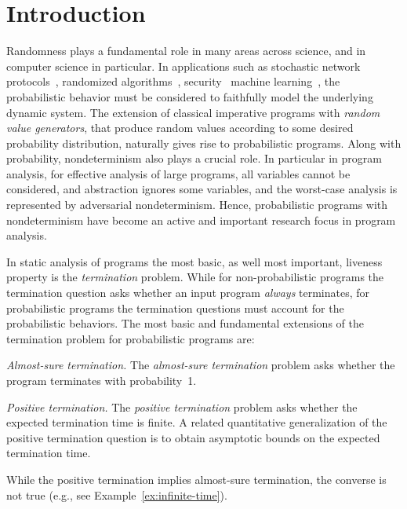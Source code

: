 

\section{Introduction}\label{sec:introduction}


Randomness plays a fundamental role in many areas across science, and in 
computer science in particular.
In applications such as stochastic network protocols~\cite{BaierBook,prism},
randomized algorithms~\cite{RandBook,RandBook2}, 
security~\cite{BGGHS16:diff-privacy-coupling,BGHP16:diff-privacy-siglog} 
machine 
learning~\cite{LearningSurvey,G15},
the probabilistic behavior must be considered to faithfully model the underlying dynamic system.
The extension of classical imperative programs with \emph{random value generators}, 
that produce random values according to some desired probability distribution, 
naturally gives rise to probabilistic programs.
Along with probability, nondeterminism also plays a crucial role.
In particular in program analysis, for effective analysis of large programs,
all variables cannot be considered, and abstraction ignores some variables,
and the worst-case analysis is represented by adversarial nondeterminism.
Hence, probabilistic programs with nondeterminism have become an active and 
important research focus in program analysis. 
 


\smallskip{} 
In static analysis of programs the most basic, as well most important, 
liveness property is the {\em termination} problem.
While for non-probabilistic programs the termination question asks whether
an input program {\em always} terminates, for probabilistic programs 
the termination questions must account for the probabilistic behaviors. 
The most basic and fundamental extensions of the termination problem 
for probabilistic programs are:

\begin{compactenum}
\item \emph{Almost-sure termination.} 
The \emph{almost-sure termination} problem asks whether the program terminates with probability~1.


\item \emph{Positive termination.} 
The \emph{positive termination} problem asks whether the expected termination time is finite.
A related quantitative generalization of the positive termination question is to obtain 
asymptotic bounds on the expected termination time.

\end{compactenum}
While the positive termination implies almost-sure termination, the converse is not true 
(e.g., see Example~\ref{ex:infinite-time}).






